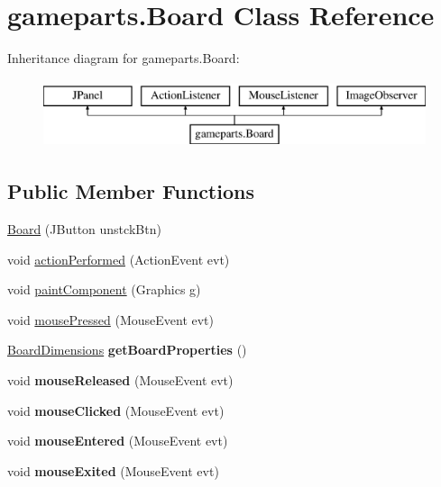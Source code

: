 \hypertarget{classgameparts_1_1_board}{\section{gameparts.\-Board Class Reference}
\label{classgameparts_1_1_board}
}
Inheritance diagram for gameparts.\-Board\-:\begin{figure}[H]
\begin{center}
\leavevmode
\includegraphics[height=2.000000cm]{classgameparts_1_1_board}
\end{center}
\end{figure}
\subsection*{Public Member Functions}
\begin{DoxyCompactItemize}
\item 
\hyperlink{classgameparts_1_1_board_a9c52eae247aec6c6073fc7ec1c20ed1f}{Board} (J\-Button unstck\-Btn)
\item 
void \hyperlink{classgameparts_1_1_board_a1513a73b6a5ca6a802238e383236cbb2}{action\-Performed} (Action\-Event evt)
\item 
void \hyperlink{classgameparts_1_1_board_a6e5f262b91e63b2544ea0b5826ab363f}{paint\-Component} (Graphics g)
\item 
void \hyperlink{classgameparts_1_1_board_aceaa44a25143a084c6a3b75d888d903d}{mouse\-Pressed} (Mouse\-Event evt)
\item 
\hypertarget{classgameparts_1_1_board_a8f9fa1238c736e4eb6579ba886bb38f9}{\hyperlink{classutilities_1_1_board_dimensions}{Board\-Dimensions} {\bfseries get\-Board\-Properties} ()}\label{classgameparts_1_1_board_a8f9fa1238c736e4eb6579ba886bb38f9}

\item 
\hypertarget{classgameparts_1_1_board_a69bb58d1f9a001eb6c42e4e8b3a6f5db}{void {\bfseries mouse\-Released} (Mouse\-Event evt)}\label{classgameparts_1_1_board_a69bb58d1f9a001eb6c42e4e8b3a6f5db}

\item 
\hypertarget{classgameparts_1_1_board_a58cd43d9e71251e8450cf634cc53ce39}{void {\bfseries mouse\-Clicked} (Mouse\-Event evt)}\label{classgameparts_1_1_board_a58cd43d9e71251e8450cf634cc53ce39}

\item 
\hypertarget{classgameparts_1_1_board_a98a9191272125ef23b7b3fd2cf6bf178}{void {\bfseries mouse\-Entered} (Mouse\-Event evt)}\label{classgameparts_1_1_board_a98a9191272125ef23b7b3fd2cf6bf178}

\item 
\hypertarget{classgameparts_1_1_board_a6b9507b1a6b392a4689fabae73452f6e}{void {\bfseries mouse\-Exited} (Mouse\-Event evt)}\label{classgameparts_1_1_board_a6b9507b1a6b392a4689fabae73452f6e}

\end{DoxyCompactItemize}


